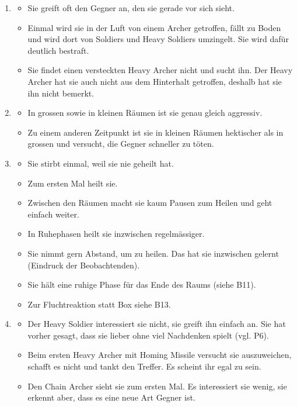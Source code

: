 \documentclass[../Main.tex]{subfiles}
\begin{document}
\begin{enumerate}[label=\textbf{B\arabic*}, leftmargin=1.5cm, itemsep=0.8em, resume]
\item
\begin{itemize}[nosep]
    \item Sie greift oft den Gegner an, den sie gerade vor sich sieht.
    \item Einmal wird sie in der Luft von einem Archer getroffen, fällt zu Boden und wird dort von Soldiers und Heavy Soldiers umzingelt. Sie wird dafür deutlich bestraft.
    \item Sie findet einen versteckten Heavy Archer nicht und sucht ihn. Der Heavy Archer hat sie auch nicht aus dem Hinterhalt getroffen, deshalb hat sie ihn nicht bemerkt.
\end{itemize}

\item
\begin{itemize}[nosep]
    \item In grossen sowie in kleinen Räumen ist sie genau gleich aggressiv.
    \item Zu einem anderen Zeitpunkt ist sie in kleinen Räumen hektischer als in grossen und versucht, die Gegner schneller zu töten.
\end{itemize}

\item
\begin{itemize}[nosep]
    \item Sie stirbt einmal, weil sie nie geheilt hat.
    \item Zum ersten Mal heilt sie.
    \item Zwischen den Räumen macht sie kaum Pausen zum Heilen und geht einfach weiter.
    \item In Ruhephasen heilt sie inzwischen regelmässiger.
    \item Sie nimmt gern Abstand, um zu heilen. Das hat sie inzwischen gelernt (Eindruck der Beobachtenden).
    \item Sie hält eine ruhige Phase für das Ende des Raums (siehe B11).
    \item Zur Fluchtreaktion statt Box siehe B13.
\end{itemize}

\item
\begin{itemize}[nosep]
    \item Der Heavy Soldier interessiert sie nicht, sie greift ihn einfach an. Sie hat vorher gesagt, dass sie lieber ohne viel Nachdenken spielt (vgl. P6).
    \item Beim ersten Heavy Archer mit Homing Missile versucht sie auszuweichen, schafft es nicht und tankt den Treffer. Es scheint ihr egal zu sein.
    \item Den Chain Archer sieht sie zum ersten Mal. Es interessiert sie wenig, sie erkennt aber, dass es eine neue Art Gegner ist.
\end{itemize}
\end{enumerate}
\end{document}
